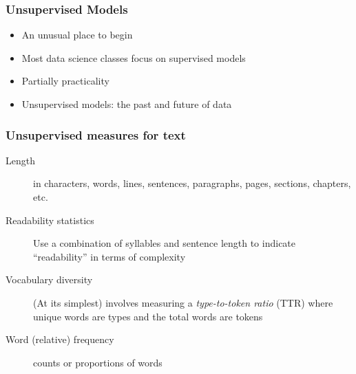 \documentclass{beamer}
\begin{document}
	

  

\begin{frame}
	\frametitle{Unsupervised Models}
	\begin{itemize}
		\item An unusual place to begin \pause 
		\item Most data science classes focus on supervised models \pause 
		\item Partially practicality \pause 
		\item Unsupervised models: the past and future of data
	\end{itemize} 
\end{frame}











\begin{frame}
	\frametitle{Unsupervised measures for text}
	\begin{description}
		\item[Length] in characters, words, lines, sentences, paragraphs,
		pages, sections, chapters, etc.
		\item[Readability statistics]  Use a combination of syllables and
		sentence length to indicate ``readability'' in terms of complexity
		\item[Vocabulary diversity] (At its simplest) involves measuring a
		\emph{type-to-token ratio} (TTR) where unique words are types and
		the total words are tokens
		\item[Word (relative) frequency] counts or proportions of words
		
	\end{description}
\end{frame}
\end{document}
